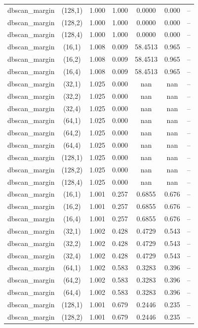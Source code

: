 \begin{tabular}{lcccccc}
dbscan\_margin & (128,1) & 1.000 & 1.000 & 0.0000 & 0.000 & -- \\
dbscan\_margin & (128,2) & 1.000 & 1.000 & 0.0000 & 0.000 & -- \\
dbscan\_margin & (128,4) & 1.000 & 1.000 & 0.0000 & 0.000 & -- \\
dbscan\_margin & (16,1) & 1.008 & 0.009 & 58.4513 & 0.965 & -- \\
dbscan\_margin & (16,2) & 1.008 & 0.009 & 58.4513 & 0.965 & -- \\
dbscan\_margin & (16,4) & 1.008 & 0.009 & 58.4513 & 0.965 & -- \\
dbscan\_margin & (32,1) & 1.025 & 0.000 & nan & nan & -- \\
dbscan\_margin & (32,2) & 1.025 & 0.000 & nan & nan & -- \\
dbscan\_margin & (32,4) & 1.025 & 0.000 & nan & nan & -- \\
dbscan\_margin & (64,1) & 1.025 & 0.000 & nan & nan & -- \\
dbscan\_margin & (64,2) & 1.025 & 0.000 & nan & nan & -- \\
dbscan\_margin & (64,4) & 1.025 & 0.000 & nan & nan & -- \\
dbscan\_margin & (128,1) & 1.025 & 0.000 & nan & nan & -- \\
dbscan\_margin & (128,2) & 1.025 & 0.000 & nan & nan & -- \\
dbscan\_margin & (128,4) & 1.025 & 0.000 & nan & nan & -- \\
dbscan\_margin & (16,1) & 1.001 & 0.257 & 0.6855 & 0.676 & -- \\
dbscan\_margin & (16,2) & 1.001 & 0.257 & 0.6855 & 0.676 & -- \\
dbscan\_margin & (16,4) & 1.001 & 0.257 & 0.6855 & 0.676 & -- \\
dbscan\_margin & (32,1) & 1.002 & 0.428 & 0.4729 & 0.543 & -- \\
dbscan\_margin & (32,2) & 1.002 & 0.428 & 0.4729 & 0.543 & -- \\
dbscan\_margin & (32,4) & 1.002 & 0.428 & 0.4729 & 0.543 & -- \\
dbscan\_margin & (64,1) & 1.002 & 0.583 & 0.3283 & 0.396 & -- \\
dbscan\_margin & (64,2) & 1.002 & 0.583 & 0.3283 & 0.396 & -- \\
dbscan\_margin & (64,4) & 1.002 & 0.583 & 0.3283 & 0.396 & -- \\
dbscan\_margin & (128,1) & 1.001 & 0.679 & 0.2446 & 0.235 & -- \\
dbscan\_margin & (128,2) & 1.001 & 0.679 & 0.2446 & 0.235 & -- \\

\end{tabular}
